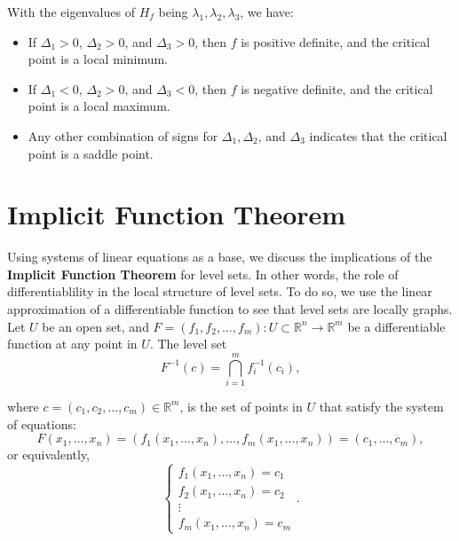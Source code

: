 \documentclass[11pt]{article}
\begin{document}
With the eigenvalues of \(H_f\) being \(\lambda_1, \lambda_2, \lambda_3\), we have:
\begin{itemize}
    \item If \(\Delta_1 > 0\), \(\Delta_2 > 0\), and \(\Delta_3 > 0\), then \(f\) is positive definite, and the critical point is a local minimum.
    \item If \(\Delta_1 < 0\), \(\Delta_2 > 0\), and \(\Delta_3 < 0\), then \(f\) is negative definite, and the critical point is a local maximum.
    \item Any other combination of signs for \(\Delta_1, \Delta_2\), and \(\Delta_3\) indicates that the critical point is a saddle point.
\end{itemize}
\pagebreak
\section{Implicit Function Theorem}
Using systems of linear equations as a base, we discuss the implications of the \textbf{Implicit Function Theorem} for level sets. 
In other words, the role of differentiablility in the local structure of level sets.
To do so, we use the linear approximation of a differentiable function to see that level sets are locally graphs.
\vskip 0.5cm
Let \(U\) be an open set, and \(F = (f_1, f_2, \dots, f_m) : U \subset \mathbb{R}^{n} \to \mathbb{R}^m\) be a differentiable function at any point in \(U\). 
The level set 
\[F^{-1}(c) = \bigcap_{i=1}^m f_i^{-1}(c_i),\] 

where \(c = (c_1, c_2, \dots, c_m) \in \mathbb{R}^m\), is the set of points in \(U\) that satisfy the system of equations:
\[F(x_1, \dots, x_n) = (f_1(x_1, \dots, x_n), \dots, f_m(x_1, \dots, x_n)) = (c_1, \dots, c_m),\]
or equivalently,
\[\begin{cases}
f_1(x_1, \dots, x_n) = c_1 \\
f_2(x_1, \dots, x_n) = c_2 \\
\vdots \\
f_m(x_1, \dots, x_n) = c_m
\end{cases}.\]
\end{document}
